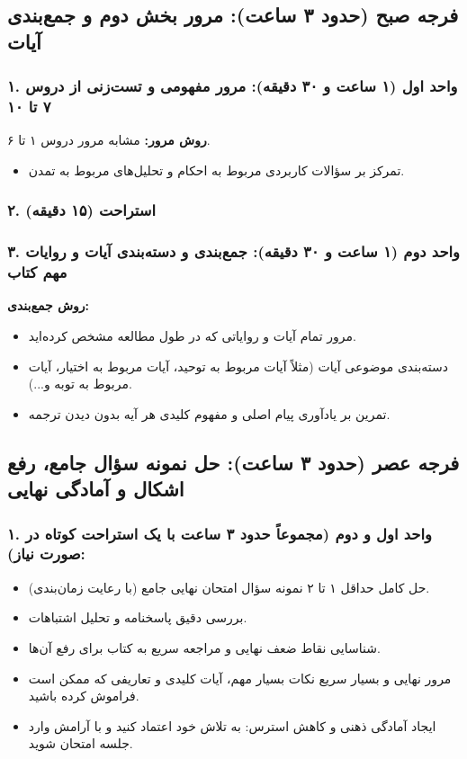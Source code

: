 \documentclass[12pt,a4paper]{article}
\begin{document}
\subsection*{فرجه صبح (حدود ۳ ساعت): مرور بخش دوم و جمع‌بندی آیات}

\subsubsection*{۱. واحد اول (۱ ساعت و ۳۰ دقیقه): مرور مفهومی و تست‌زنی از دروس ۷ تا ۱۰}
\textbf{روش مرور:} مشابه مرور دروس ۱ تا ۶.
\begin{itemize}
    \item تمرکز بر سؤالات کاربردی مربوط به احکام و تحلیل‌های مربوط به تمدن.
\end{itemize}

\subsubsection*{۲. استراحت (۱۵ دقیقه)}

\subsubsection*{۳. واحد دوم (۱ ساعت و ۳۰ دقیقه): جمع‌بندی و دسته‌بندی آیات و روایات مهم کتاب}
\textbf{روش جمع‌بندی:}
\begin{itemize}
    \item مرور تمام آیات و روایاتی که در طول مطالعه مشخص کرده‌اید.
    \item دسته‌بندی موضوعی آیات (مثلاً آیات مربوط به توحید، آیات مربوط به اختیار، آیات مربوط به توبه و...).
    \item تمرین بر یادآوری پیام اصلی و مفهوم کلیدی هر آیه بدون دیدن ترجمه.
\end{itemize}

\hrulefill
\subsection*{فرجه عصر (حدود ۳ ساعت): حل نمونه سؤال جامع، رفع اشکال و آمادگی نهایی}

\subsubsection*{۱. واحد اول و دوم (مجموعاً حدود ۳ ساعت با یک استراحت کوتاه در صورت نیاز):}
\begin{itemize}
    \item حل کامل حداقل ۱ تا ۲ نمونه سؤال امتحان نهایی جامع (با رعایت زمان‌بندی).
    \item بررسی دقیق پاسخنامه و تحلیل اشتباهات.
    \item شناسایی نقاط ضعف نهایی و مراجعه سریع به کتاب برای رفع آن‌ها.
    \item مرور نهایی و بسیار سریع نکات بسیار مهم، آیات کلیدی و تعاریفی که ممکن است فراموش کرده باشید.
    \item ایجاد آمادگی ذهنی و کاهش استرس: به تلاش خود اعتماد کنید و با آرامش وارد جلسه امتحان شوید.
\end{itemize}
\end{document}

